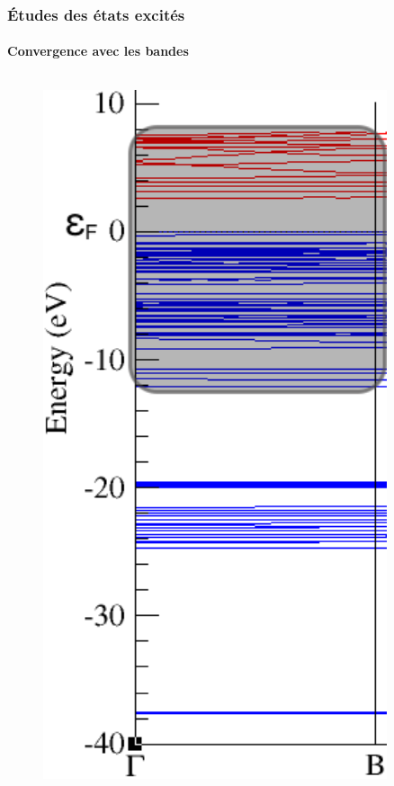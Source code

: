 \documentclass[french]{beamer}
\begin{document}
\begin{frame}
\frametitle{Études des états excités}
\framesubtitle{Convergence avec les bandes}
\begin{columns}
  \begin{column}{\paperwidth-10pt}
    \begin{figure}[!h]
    \centering
    \vspace{10pt}
    \includegraphics[width=0.9\textwidth]{band_structure_2}

\end{figure}
\end{column}
\end{columns}
\end{frame}
\end{document}
